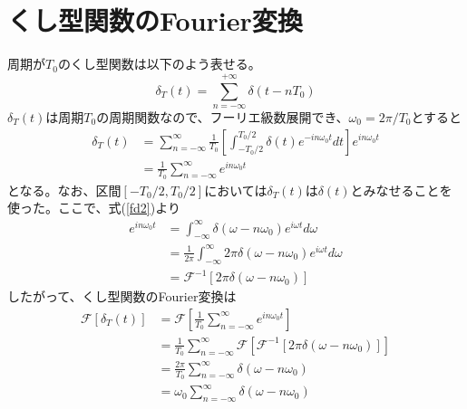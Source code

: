 \documentclass[]{jlreq}
\begin{document}
\section{くし型関数のFourier変換}
周期が$T_0$のくし型関数は以下のよう表せる。
%
\begin{equation}
  \delta_T (t) = \sum_{n=-\infty}^{+\infty} \delta (t - n T_0 )
\end{equation}
%
$\delta_T (t)$は周期$T_0$の周期関数なので、フーリエ級数展開でき、$\omega_0 = 2\pi / T_0$とすると
%
\begin{align}
  \delta_T(t) &= \sum_{n = -\infty}^{\infty} \frac{1}{T_0} \left[\int_{-T_0/2}^{T_0/2}\delta (t) e^{-i n \omega_0 t} dt\right] 
  e^{i n \omega_0 t} \\
              &= \frac{1}{T_0} \sum_{n = -\infty}^{\infty} e^{i n \omega_0 t} 
\end{align}
%
となる。なお、区間$[-T_0/2, T_0/2]$においては$\delta_T(t)$は$\delta(t)$とみなせることを使った。ここで、式(\ref{fd2})より
%
\begin{align}
  e^{i n \omega_0 t} &=  \int_{-\infty}^{\infty} \delta (\omega - n \omega_0) e^{i \omega t} d\omega \\ 
      &= \frac{1}{2\pi} \int_{-\infty}^{\infty} 2\pi \delta (\omega - n \omega_0) e^{i \omega t} d\omega \\ 
      &= \mathcal{F}^{-1}[2\pi \delta(\omega - n\omega_0)] 
\end{align}
%
したがって、くし型関数のFourier変換は
%
\begin{align}
  \mathcal{F}[\delta_T(t)] &= \mathcal{F}\left[\frac{1}{T_0} \sum_{n = -\infty}^{\infty} e^{i n \omega_0 t}\right] \\ 
      & = \frac{1}{T_0} \sum_{n = -\infty}^{\infty} \mathcal{F}[\mathcal{F}^{-1}[2\pi \delta(\omega - n\omega_0)]] \\ 
      & = \frac{2 \pi}{T_0} \sum_{n = -\infty}^{\infty} \delta(\omega - n\omega_0)\\ 
      &= \omega_0 \sum_{n = -\infty}^{\infty} \delta(\omega - n\omega_0)
\end{align}
%
\end{document}
